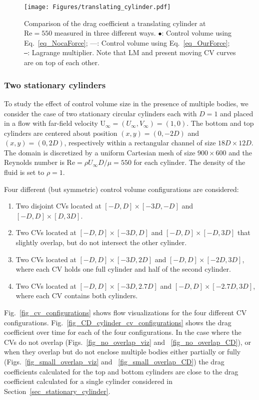 \documentclass[review]{elsarticle}
\renewcommand{\vec}[1]{\bm{\mathrm{#1}}}
\def \U{\vec{U}}
\def \U{\vec{U}}
\def \Re{\text{Re}}
\begin{document}
\begin{figure}[H]
  \centering
    \texttt{[image: Figures/translating\_cylinder.pdf]}
  \caption{Comparison of the drag coefficient a translating 
    cylinder at $\Re = 550$ measured in three different ways.
    $\bullet$: Control volume using Eq.~\eqref{eq_NocaForce};
    ---: Control volume using Eq.~\eqref{eq_OurForce};
     \texttt{---}: Lagrange multiplier. Note that LM and present moving
     CV curves are on top of each other.}
  \label{fig_translating_cylinder}
\end{figure}


\subsubsection {Two stationary cylinders} \label{sec_two_cylinders}


To study the effect of control volume size in the presence of multiple bodies, 
we consider the case of two stationary circular cylinders each
with $D = 1$ and placed in a flow with far-field velocity 
$\U_{\infty} = (U_{\infty}, V_{\infty})=(1,0)$. The bottom and top cylinders
are centered about position $(x,y) = (0,-2D)$ and $(x,y) = (0,2D)$, respectively within
a rectangular channel of size $18 D \times 12 D$. The domain is discretized 
by a uniform Cartesian mesh of size $900 \times 600$ and the Reynolds number 
is $\Re = \rho U_{\infty} D / \mu = 550$ for each cylinder. The density of the fluid
is set to $\rho = 1$.

Four different (but symmetric) control volume configurations are considered: 
\begin{enumerate}
	\item Two disjoint CVs located at $[-D,D]\times[-3D,-D]$ and $[-D,D]\times[D,3D]$.
	\item Two CVs located at  $[-D,D]\times[-3D,D]$ and $[-D,D]\times[-D,3D]$ that 
		slightly overlap, but do not intersect the other cylinder.
	\item Two CVs located at $[-D,D]\times[-3D,2D]$ and $[-D,D]\times[-2D,3D]$,
		    where each CV holds one full cylinder and half of the second cylinder.
         \item Two CVs located at $[-D,D]\times[-3D,2.7D]$ and $[-D,D]\times[-2.7D,3D]$,
         	 where each CV contains both cylinders. 
\end{enumerate}

Fig.~\ref{fig_cv_configurations} shows flow visualizations for the four different 
CV configurations. Fig.~\ref{fig_CD_cylinder_cv_configurations} shows the 
drag coefficient over time for each of the four configurations.
In the case where the CVs do not overlap (Figs.~\ref{fig_no_overlap_viz} and
~\ref{fig_no_overlap_CD}), or when they overlap but do not enclose multiple 
bodies either partially or fully (Figs.~\ref{fig_small_overlap_viz} and ~\ref{fig_small_overlap_CD})
the drag coefficients calculated for the top and bottom cylinders are close to the drag 
coefficient calculated for a single cylinder considered in Section~\ref{sec_stationary_cylinder}.
\end{document}
